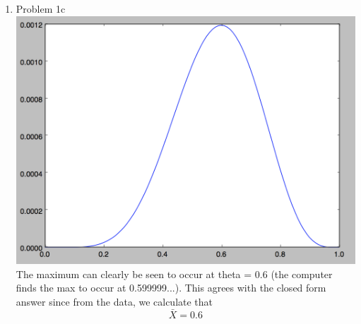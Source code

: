\documentclass[11pt]{article}
\newcommand{\solution}[1]{{{\color{blue}{\bf Solution:} {#1}}}}
\begin{document}
\begin{enumerate}
\vspace{1cm}
\item Problem 1c
\solution{ \newline{}
\includegraphics[scale=0.5]{1CPlot.png} \newline{}
The maximum can clearly be seen to occur at theta = 0.6 (the computer finds the max to occur at 0.599999...). This agrees with the closed form answer since from the data, we calculate that \[ \bar{X} = 0.6 \]
}


\end{enumerate}
\end{document}
